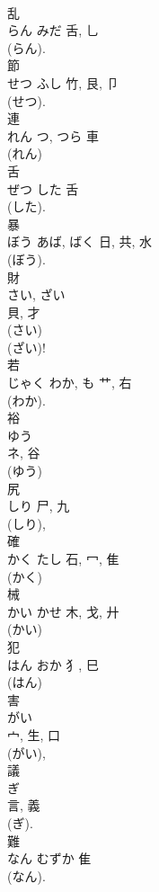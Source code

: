 \documentclass[8pt]{extreport}
\begin{document}
\begin{CJK}{UTF8}{min}
\\	乱	
\\	らん	みだ	舌, 乚	
\\	(らん). 
\\	節	
\\	せつ	ふし	竹, 艮, 卩	
\\	(せつ). 
\\	連	
\\	れん	つ, つら	車		
\\	(れん) 
\\	舌	
\\	ぜつ	した	舌	
\\	(した). 
\\	暴	
\\	ぼう	あば, ばく	日, 共, 水	
\\	(ぼう). 
\\	財	
\\	さい, ざい	
\\	貝, 才	
\\	(さい) 
\\	(ざい)!	
\\	若	
\\	じゃく	わか, も	艹, 右	
\\	(わか). 
\\	裕	
\\	ゆう	
\\	ネ, 谷	
\\	(ゆう) 
\\	尻	
\\	しり	尸, 九	
\\	(しり), 
\\	確	
\\	かく	たし	石, 冖, 隹	
\\	(かく) 
\\	械	
\\	かい	かせ	木, 戈, 廾	
\\	(かい) 
\\	犯	
\\	はん	おか	犭, 巳	
\\	(はん) 
\\	害	
\\	がい	
\\	宀, 生, 口	
\\	(がい), 
\\	議	
\\	ぎ	
\\	言, 義	
\\	(ぎ). 
\\	難	
\\	なん	むずか	隹		
\\	(なん). 

\end{CJK}
\end{document}
